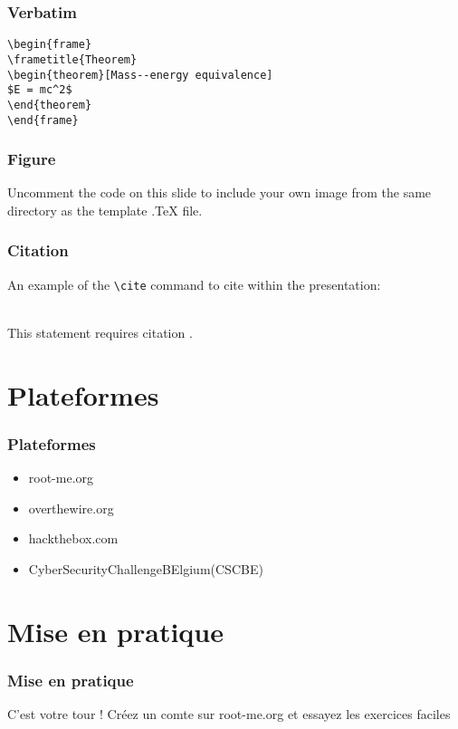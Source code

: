 \documentclass{beamer}
\begin{document}

\begin{frame}[fragile] %
\frametitle{Verbatim}
\begin{example}
\begin{verbatim}
\begin{frame}
\frametitle{Theorem}
\begin{theorem}[Mass--energy equivalence]
$E = mc^2$
\end{theorem}
\end{frame}\end{verbatim}
\end{example}
\end{frame}


\begin{frame}
\frametitle{Figure}
Uncomment the code on this slide to include your own image from the same directory as the template .TeX file.
\end{frame}


\begin{frame}[fragile] %
\frametitle{Citation}
An example of the \verb|\cite| command to cite within the presentation:\\~

This statement requires citation \cite{p1}.
\end{frame}


\section{Plateformes}

\begin{frame}\frametitle{Plateformes}
    \begin{itemize}
        \item root-me.org
        \item overthewire.org
        \item hackthebox.com
        \item CyberSecurityChallengeBElgium(CSCBE)
    \end{itemize}
\end{frame}



\section{Mise en pratique}
\begin{frame}
\frametitle{Mise en pratique}

    C'est votre tour ! Créez un comte sur root-me.org et essayez les exercices faciles

\end{frame}
\end{document}
